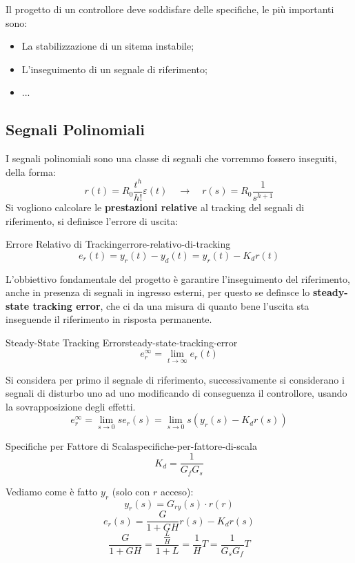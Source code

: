 \documentclass[12pt]{article}
\begin{document}
Il progetto di un controllore deve soddisfare delle specifiche, le pi\`u importanti sono:
\begin{itemize}
    \item La stabilizzazione di un sitema instabile;
    \item L'inseguimento di un segnale di riferimento;
    \item ...
\end{itemize}

\subsection{Segnali Polinomiali}
I segnali polinomiali sono una classe di segnali che vorremmo fossero inseguiti, della forma:
\[ r(t) = R_0 \frac{t^{h}}{h!}\varepsilon(t) \quad\longrightarrow\quad r(s) = R_0 \frac{1}{s^{h+1}}  \]
Si vogliono calcolare le \textbf{prestazioni relative} al tracking del segnali di riferimento, si definisce l'errore di uscita:
\begin{definition}{Errore Relativo di Tracking}{errore-relativo-di-tracking}
    \[ e_r(t) = y_r(t) - y_d(t) = y_r (t) - K_dr(t) \]
\end{definition}



L'obbiettivo fondamentale del progetto \`e garantire l'inseguimento del riferimento, anche in presenza di segnali in ingresso esterni, per questo se definsce lo \textbf{steady-state tracking error}, che ci da una misura di quanto bene l'uscita sta inseguende il riferimento in risposta permanente.
\begin{definition}{Steady-State Tracking Error}{steady-state-tracking-error}
    \[ e _{r}^{\infty} = \lim_{t \to \infty} e_r(t) \]
\end{definition}

Si considera per primo il segnale di riferimento, successivamente si considerano i segnali di disturbo uno ad uno modificando di conseguenza il controllore, usando la sovrapposizione degli effetti.
\[ e_r^{\infty} = \lim_{s \to 0} se_r(s) = \lim_{s \to 0} s(y_r(s) - K_dr(s))  \]
\begin{theorem}{Specifiche per Fattore di Scala}{specifiche-per-fattore-di-scala}
    \[ K_d = \frac{1}{G_fG_s}  \]
\end{theorem}

Vediamo come \`e fatto $y_r$ (solo con $r$ acceso):
\[ y_r(s) = G _{ry}(s) \cdot r(r) \]
\[ e_r(s) = \frac{G}{1 + GH} r(s) - K_dr(s) \]
\[ \frac{G}{1 + GH}  = \frac{\frac{L}{H} }{1 + L} =  \frac{1}{H} T = \frac{1}{G_sG_f} T \]
\end{document}
